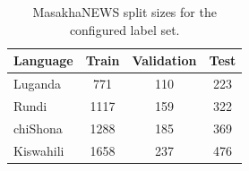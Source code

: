 \begin{table}[t]
\centering
\caption{MasakhaNEWS split sizes for the configured label set.}
\label{tab:dataset_stats}
\small
\begin{tabular}{lccc}
\toprule
Language & Train & Validation & Test \\
\midrule
Luganda & 771 & 110 & 223 \\
Rundi & 1117 & 159 & 322 \\
chiShona & 1288 & 185 & 369 \\
Kiswahili & 1658 & 237 & 476 \\
\bottomrule
\end{tabular}
\end{table}